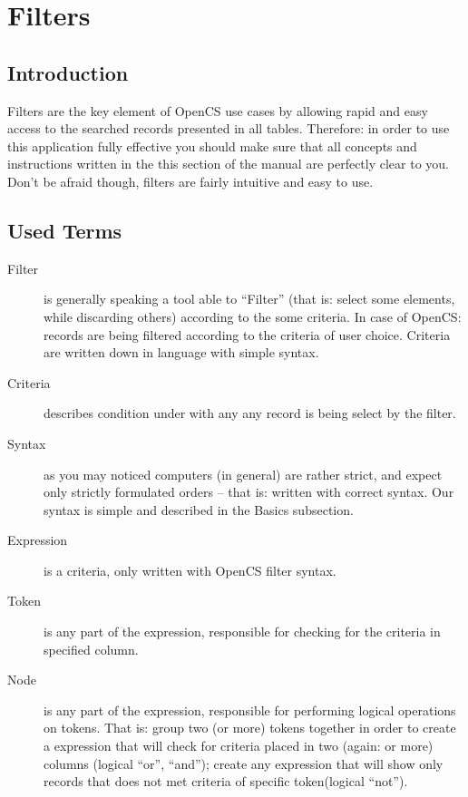 \section{Filters}
\subsection{Introduction}
Filters are the key element of OpenCS use cases by allowing rapid and easy access to the searched records presented in all tables. Therefore: in order to use this application fully effective you should make sure that all concepts and instructions written in the this section of the manual are perfectly clear to you.\\
Don't be afraid though, filters are fairly intuitive and easy to use.

\subsection{Used Terms}

\begin{description}
 \item[Filter] is generally speaking a tool able to ``Filter'' (that is: select some elements, while discarding others) according to the some criteria. In case of OpenCS: records are being filtered according to the criteria of user choice. Criteria are written down in language with simple syntax.
 \item[Criteria] describes condition under with any any record is being select by the filter.
 \item[Syntax] as you may noticed computers (in general) are rather strict, and expect only strictly formulated orders -- that is: written with correct syntax. Our syntax is simple and described in the {B}asics subsection.
 \item[Expression] is a criteria, only written with OpenCS filter syntax.
 \item[Token] is any part of the expression, responsible for checking for the criteria in specified column.
 \item[Node] is any part of the expression, responsible for performing logical operations on tokens. That is: group two (or more) tokens together in order to create a expression that will check for criteria placed in two (again: or more) columns (logical ``or'', ``and''); create any expression that will show only records that does not met criteria of specific token(logical ``not'').
\end{description}

